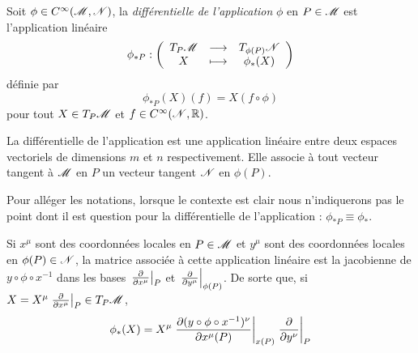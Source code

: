 \documentclass[a4paper,11pt]{report}
\begin{document}
                \begin{defn}
                    Soit $\phi\in C^\infty(\mathscr{M},\mathscr{N})$, la \textit{différentielle de l'application} $\phi$ en $P\in\mathscr{M}$ est l'application linéaire
                    \begin{equation}
                        \phi_{*P}:\left(
                    \begin{array}{ccc}
                        T_P\mathscr{M} & \longrightarrow & T_{\phi(P)}\mathscr{N} \\
                        X & \longmapsto & \phi_*(X)
                    \end{array}
                    \right)
                    \end{equation}
                    définie par
                    \begin{equation}
                        \phi_{*P}(X)(f) = X(f\circ\phi)
                    \end{equation}
                    pour tout $X\in T_P\mathscr{M}$ et $f\in C^{\infty}(\mathscr{N},\mathbb{R})$.
                \end{defn}
                
                La différentielle de l'application est une application linéaire entre deux espaces vectoriels de dimensions $m$ et $n$ respectivement. Elle associe à tout vecteur tangent à $\mathscr{M}$ en $P$ un vecteur tangent $\mathscr{N}$ en $\phi(P)$.
                
                \begin{rmk}
                    Pour alléger les notations, lorsque le contexte est clair nous n'indiquerons pas le point dont il est question pour la différentielle de l'application : $\phi_{*P}\equiv\phi_*$.
                \end{rmk}
                
                \begin{prop}\begin{leftbar}
                    Si $x^\mu$ sont des coordonnées locales en $P\in\mathscr{M}$ et $y^\mu$ sont des coordonnées locales en $\phi(P)\in\mathscr{N}$, la matrice associée à cette application linéaire est la jacobienne de $y\circ\phi\circ x^{-1}$ dans les bases $\eval{\pdv{}{x^\mu}}_{P}$ et  $\eval{\pdv{}{y^\mu}}_{\phi(P)}$. De sorte que, si $X = X^\mu\eval{\pdv{}{x^\mu}}_{P}\in T_P\M$, 
                    \begin{equation}
                        \phi_*(X) = X^\mu\eval{\pdv{(y\circ\phi\circ x^{-1})^\nu}{x^\mu(P)}(x^1(P),\dots,x^n(P))}_{x(P)}\eval{\pdv{}{y^\nu}}_{P}
                    \end{equation}
                \end{leftbar}\end{prop}
                
\end{document}
